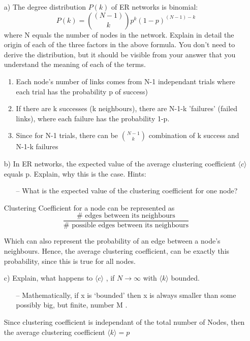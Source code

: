 \documentclass[a4paper,12pt]{article}
\begin{document}
\begin{itemize}
 \item[a) ] The degree distribution $P(k)$ of ER networks is binomial: $$P(k) = \binom{(N-1)}{k}p^k (1-p)^{(N-1) - k}  $$ where N equals the number of nodes in the network. Explain in detail the origin of each
of the three factors in the above formula. You don’t need to derive the distribution, but it
should be visible from your answer that you understand the meaning of each of the terms.

\begin{enumerate}
\item Each node’s number of links comes
  from N-1 independant trials where each trial has the probability p of success)
\item If there are k successes (k neighbours), there are N-1-k 'failures' (failed links), where each failure has the probability 1-p.

\item Since for N-1 trials, there can be $\binom{N-1}{k}$ combination of k success and N-1-k failures 
\end{enumerate}

\item[b) ] In ER networks, the expected value of the average clustering coefficient $\langle c \rangle  $ equals
p. Explain, why this is the case.
Hints:
\begin{itemize}
\item[--] What is the expected value of the clustering coefficient for one node?
\end{itemize}
  
Clustering Coefficient for a node can be represented as $$\frac{\# \text{ edges between
    its neighbours}}{\# \text{ possible edges between its neighbours} } $$

Which can also represent the probability of an edge between a node's neighbours. Hence, the average clustering coefficient, can be exactly this probability, since this is true for all nodes.

\item[c) ] Explain, what happens to $ \langle c \rangle $  , if $N \rightarrow \infty$ with     $\langle k \rangle $ bounded.


  \begin{itemize}
  \item[--] Mathematically, if x is ‘bounded’ then x is always smaller than some possibly big, but finite, number M .
  \end{itemize}
  Since clustering coefficient is independant of the total number of Nodes, then the average clustering coefficient  $\langle k \rangle = p$


\end{itemize}
\end{document}

